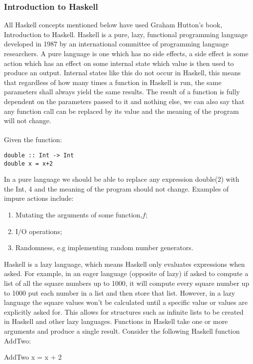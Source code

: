\documentclass{article}%
\begin{document}
\subsubsection{Introduction to Haskell}
All Haskell concepts mentioned below have used Graham Hutton’s book, Introduction to Haskell. Haskell is a pure, lazy, functional programming language developed in 1987 by an international committee of programming language researchers. A pure language is one which has no side effects, a side effect is some action which has an effect on some internal state which value is then used to produce an output. Internal states like this do not occur in Haskell, this means that regardless of how many times a function in Haskell is run, the same parameters shall always yield the same results. The result of a function is fully dependent on the parameters passed to it and nothing else, we can also say that any function call can be replaced by its value and the meaning of the program will not change. \\\\
Given the function:\\
\begin{verbatim}
double :: Int -> Int 
double x = x+2
\end{verbatim}
In a pure language we should be able to replace any expression double(2) with the Int, 4 and the meaning of the program should not change. 
Examples of impure actions include: 
\begin{enumerate}
\item Mutating the arguments of some function,$f$;
\item I/O operations;
\item Randomness, e.g implementing random number generators. 
\end{enumerate}
Haskell is a lazy language, which means Haskell only evaluates expressions when asked. For example, in an eager language (opposite of lazy) if asked to compute a list of all the square numbers up to 1000, it will compute every square number up to 1000 put each number in a list and then store that list. However, in a lazy language the square values won’t be calculated until a specific value or values are explicitly asked for. This allows for structures such as infinite lists to be created in Haskell and other lazy languages.
Functions in Haskell take one or more arguments and produce a single result. 
Consider the following Haskell function AddTwo: 
\begin{myFunctionStyle}
AddTwo x = x + 2
\end{myFunctionStyle}
\end{document}
